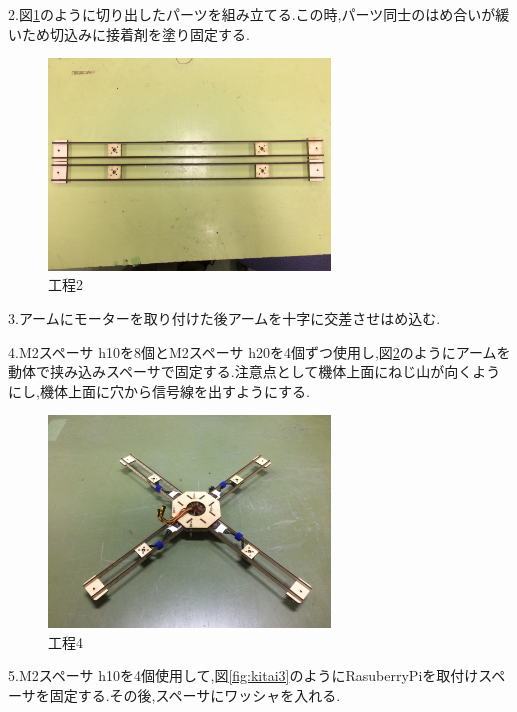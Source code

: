 \documentclass[12pt,oneside]{sotsuken_paper}
\begin{document}
2.図\ref{fig:kitai1}のように切り出したパーツを組み立てる.この時,パーツ同士のはめ合いが緩いため切込みに接着剤を塗り固定する.

\begin{figure}[htbp]
	\begin{center}
		\includegraphics[width=75mm]{image/kitai/kitai1.jpg}
		\caption{工程2}
		\label{fig:kitai1}
	\end{center}
\end{figure}


3.アームにモーターを取り付けた後アームを十字に交差させはめ込む.


4.M2スペーサ h10を8個とM2スペーサ h20を4個ずつ使用し,図\ref{fig:kitai2}のようにアームを動体で挟み込みスペーサで固定する.注意点として機体上面にねじ山が向くようにし,機体上面に穴から信号線を出すようにする.

\begin{figure}[htbp]
	\begin{center}
		\includegraphics[width=75mm]{image/kitai/kitai2.jpg}
		\caption{工程4}
		\label{fig:kitai2}
	\end{center}
\end{figure}


5.M2スペーサ h10を4個使用して,図\ref{fig:kitai3}のようにRasuberryPiを取付けスペーサを固定する.その後,スペーサにワッシャを入れる.
\end{document}
